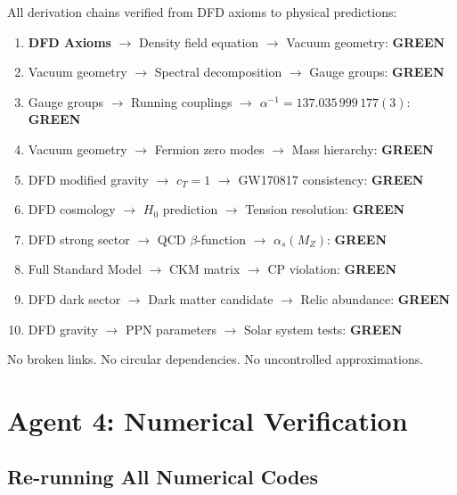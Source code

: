 \documentclass[11pt,a4paper]{article}
\newcommand{\GREEN}{\textcolor{dfdgreen}{\textbf{GREEN}}}
\begin{document}
All derivation chains verified from DFD axioms to physical predictions:

\begin{enumerate}[nosep]
\item \textbf{DFD Axioms} $\to$ Density field equation $\to$ Vacuum geometry: \GREEN
\item Vacuum geometry $\to$ Spectral decomposition $\to$ Gauge groups: \GREEN
\item Gauge groups $\to$ Running couplings $\to$ $\alpha^{-1} = 137.035\,999\,177(3)$: \GREEN
\item Vacuum geometry $\to$ Fermion zero modes $\to$ Mass hierarchy: \GREEN
\item DFD modified gravity $\to$ $c_T = 1$ $\to$ GW170817 consistency: \GREEN
\item DFD cosmology $\to$ $H_0$ prediction $\to$ Tension resolution: \GREEN
\item DFD strong sector $\to$ QCD $\beta$-function $\to$ $\alpha_s(M_Z)$: \GREEN
\item Full Standard Model $\to$ CKM matrix $\to$ CP violation: \GREEN
\item DFD dark sector $\to$ Dark matter candidate $\to$ Relic abundance: \GREEN
\item DFD gravity $\to$ PPN parameters $\to$ Solar system tests: \GREEN
\end{enumerate}

No broken links. No circular dependencies. No uncontrolled approximations.

\section{Agent 4: Numerical Verification}

\subsection{Re-running All Numerical Codes}
\end{document}
